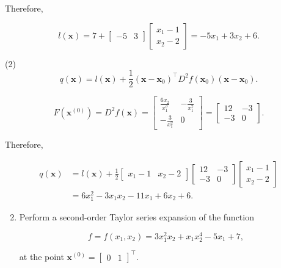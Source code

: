 Therefore,

\begin{equation*}
	l(\boldsymbol{x})=7+\left[\begin{array}{ll}
		-5 & 3
	\end{array}\right]\left[\begin{array}{l}
		x_{1}-1 \\
		x_{2}-2
	\end{array}\right]=-5 x_{1}+3 x_{2}+6 .
\end{equation*}

(2)
\[q(\boldsymbol{x})=l(\boldsymbol{x})+\frac{1}{2}\left(\boldsymbol{x}-\boldsymbol{x}_{0}\right)^{\top} D^{2} f\left(\boldsymbol{x}_{0}\right)\left(\boldsymbol{x}-\boldsymbol{x}_{0}\right). \]

\begin{equation*}
	F(\boldsymbol{x}^{(0)})
	=D^{2} f(\boldsymbol{x})
	=\left[\begin{array}{cc}
		\frac{6 x_{2}}{x_{1}^{3}} & -\frac{3}{x_{1}^{2}} \\
		-\frac{3}{x_{1}^{2}} & 0
	\end{array} 
	\right]
	= \left[\begin{array}{cc}12 & -3 \\ -3 & 0\end{array}\right].
\end{equation*}

Therefore,

\begin{equation*}
	\begin{aligned}
		q(\boldsymbol{x}) & =l(\boldsymbol{x})+\frac{1}{2}\left[\begin{array}{ll}
			x_{1}-1 & x_{2}-2
		\end{array}\right]\left[\begin{array}{cc}
			12 & -3 \\
			-3 & 0
		\end{array}\right]\left[\begin{array}{l}
			x_{1}-1 \\
			x_{2}-2
		\end{array}\right] \\
		& =6 x_{1}^{2}-3 x_{1} x_{2}-11 x_{1}+6 x_{2}+6 .
	\end{aligned}
\end{equation*}


\bigskip
\noindent
\begin{enumerate}
	\setcounter{enumi}{1}
	\item Perform a second-order Taylor series expansion of the function
	
	\begin{equation*}
		f=f\left(x_{1}, x_{2}\right)=3 x_{1}^{2}x_{2}+x_{1} x_{2}^{4}-5 x_{1}+7,
	\end{equation*}
	
	at the point \(\boldsymbol{x}^{(0)}=\left[\begin{array}{ll}0 & 1\end{array}\right]^{\top}\).
\end{enumerate}
	
